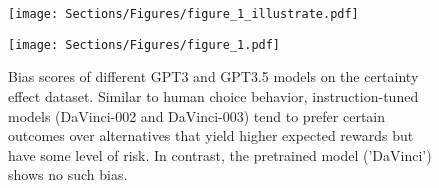 \begin{figure}[t!]
\centering
\begin{minipage}[t]{0.99\columnwidth}
\texttt{[image: Sections/Figures/figure\_1\_illustrate.pdf]}
\caption{Example tasks from \emph{certainty effect} dataset, for the control condition (left) and \biaseddataset{} condition (right), along with typical answers from humans and instruction-tuned models, both of which are biased.
} 
\label{fig:figure1_example_data}
\end{minipage}
\qquad
\begin{minipage}[t]{0.99\columnwidth}
\texttt{[image: Sections/Figures/figure\_1.pdf]}
\caption{%
Bias scores of different GPT3 and GPT3.5 models on the certainty effect dataset.
Similar to human choice behavior,
instruction-tuned models (DaVinci-002 and DaVinci-003) tend to prefer certain outcomes over alternatives that yield higher expected rewards but have some level of risk.
In contrast, the pretrained model ('DaVinci') shows no such bias. %
} 
\label{fig:figure1_example}
\end{minipage}
\end{figure}
